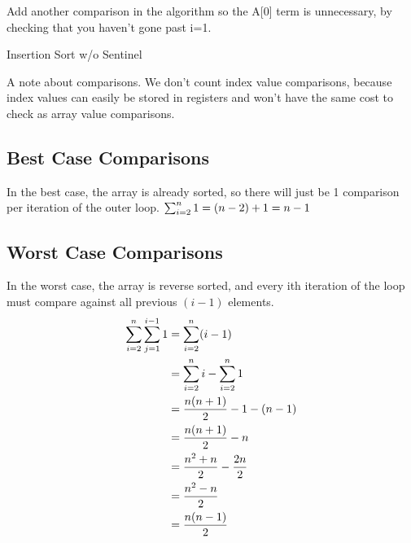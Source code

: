 \documentclass[english, 10pt]{article}
\begin{document}
Add another comparison in the algorithm so the A[0] term is unnecessary, by checking that you haven't gone past i=1.

\begin{algorithm}[H]
\caption{Insertion Sort w/o Sentinel}
\end{algorithm}

A note about comparisons. We don't count index value comparisons, because index values can easily be stored in registers and won't have the same
cost to check as array value comparisons.

\subsection{Best Case Comparisons}
In the best case, the array is already sorted, so there will just be 1 comparison per iteration of the outer loop. $\sum_{i=2}^{n} 1 = (n-2) + 1 = n-1$

\subsection{Worst Case Comparisons}
In the worst case, the array is reverse sorted, and every ith iteration of the loop must compare against all previous $(i-1)$  elements.
\begin{align*}
    \sum_{i=2}^{n}\sum_{j=1}^{i-1}1 &= \sum_{i=2}^{n} (i-1) \\
    &= \sum_{i=2}^{n} i - \sum_{i=2}^{n} 1 \\
    &= \frac{n(n+1)}{2} -1 -(n-1) \\
    &= \frac{n(n+1)}{2} -n \\
    &= \frac{n^2 + n}{2} -\frac{2n}{2} \\
    &= \frac{n^2 - n}{2} \\
    &= \frac{n(n-1)}{2} \\
\end{align*}
\end{document}
